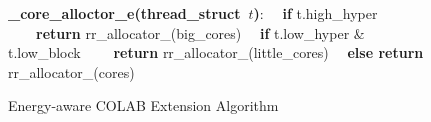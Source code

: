



\begin{figure}[!t]
\label{alg:2}
\begin{algorithmic}[]
\STATE \textbf{\_core\_alloctor\_e(thread\_struct\ $t$)}:
\STATE \ \ \textbf{if} t.high\_hyper
\STATE \ \ \ \ \textbf{return} rr\_allocator\_(big\_cores)
\STATE \ \ \textbf{if} {t.low\_hyper \& t.low\_block}
\STATE \ \ \ \ \textbf{return} rr\_allocator\_(little\_cores)
\STATE \ \ \textbf{else return} rr\_allocator\_(cores)
\end{algorithmic}
\caption{Energy-aware COLAB Extension Algorithm}
\end{figure}

